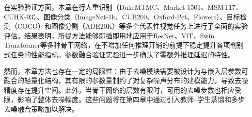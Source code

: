 在实验验证方面，本章在行人重识别（DukeMTMC、Market-1501、MSMT17、CUHK-03）、图像分类（ImageNet-1k、CUB200、Oxford-Pet、Flowers）、目标检测（COCO）和图像分割（ADE20K）等多个代表性视觉任务上进行了全面的实验评估。结果表明，所提方法能够即插即用地应用于ResNet、ViT、Swin Transformer等多种骨干网络，在不增加任何推理开销的前提下稳定提升各项判别式任务的性能指标。参数融合验证实验进一步确认了零额外推理延迟的特性。

然而，本章方法也存在一定的局限性：由于去噪模块需要被设计为与嵌入层参数可融合的轻量化结构，其有限的参数量制约了对复杂噪声分布的建模能力，导致去噪精度存在提升空间。此外，当骨干网络的层数有限时，可用的去噪步数也相应受限，影响了整体去噪幅度。这些问题将在第四章中通过引入教师--学生蒸馏和多步去噪融合策略加以解决。
